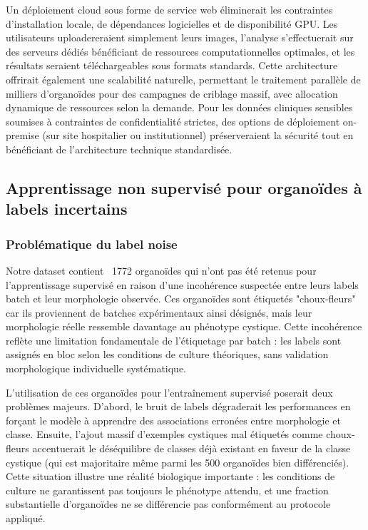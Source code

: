 Un déploiement cloud sous forme de service web éliminerait les contraintes d'installation locale, de dépendances logicielles et de disponibilité GPU. Les utilisateurs uploadereraient simplement leurs images, l'analyse s'effectuerait sur des serveurs dédiés bénéficiant de ressources computationnelles optimales, et les résultats seraient téléchargeables sous formats standards. Cette architecture offrirait également une scalabilité naturelle, permettant le traitement parallèle de milliers d'organoïdes pour des campagnes de criblage massif, avec allocation dynamique de ressources selon la demande. Pour les données cliniques sensibles soumises à contraintes de confidentialité strictes, des options de déploiement on-premise (sur site hospitalier ou institutionnel) préserveraient la sécurité tout en bénéficiant de l'architecture technique standardisée.

\subsection{Apprentissage non supervisé pour organoïdes à labels incertains}

\subsubsection{Problématique du label noise}

Notre dataset contient ~1772 organoïdes qui n'ont pas été retenus pour l'apprentissage supervisé en raison d'une incohérence suspectée entre leurs labels batch et leur morphologie observée. Ces organoïdes sont étiquetés "choux-fleurs" car ils proviennent de batches expérimentaux ainsi désignés, mais leur morphologie réelle ressemble davantage au phénotype cystique. Cette incohérence reflète une limitation fondamentale de l'étiquetage par batch : les labels sont assignés en bloc selon les conditions de culture théoriques, sans validation morphologique individuelle systématique.

L'utilisation de ces organoïdes pour l'entraînement supervisé poserait deux problèmes majeurs. D'abord, le bruit de labels dégraderait les performances en forçant le modèle à apprendre des associations erronées entre morphologie et classe. Ensuite, l'ajout massif d'exemples cystiques mal étiquetés comme choux-fleurs accentuerait le déséquilibre de classes déjà existant en faveur de la classe cystique (qui est majoritaire même parmi les 500 organoïdes bien différenciés). Cette situation illustre une réalité biologique importante : les conditions de culture ne garantissent pas toujours le phénotype attendu, et une fraction substantielle d'organoïdes ne se différencie pas conformément au protocole appliqué.

